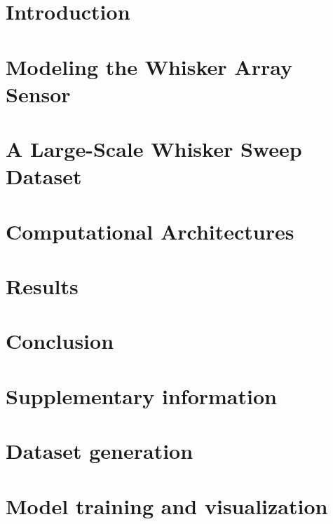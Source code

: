 \documentclass{article}
\newcommand{\beginsupplement}{%
	\setcounter{table}{0}
	\renewcommand{\thetable}{S\arabic{table}}%
	\setcounter{figure}{0}
	\renewcommand{\thefigure}{S\arabic{figure}}%
	\setcounter{section}{0}
	\renewcommand{\thesection}{\arabic{section}}%
}
\begin{document}
\section{Introduction} %
\vspace{-4mm}

\vspace{-3mm}
\section{Modeling the Whisker Array Sensor} %
\vspace{-4mm}

\vspace{-3mm}
\section{A Large-Scale Whisker Sweep Dataset} %
\vspace{-4mm}

\vspace{-3mm}
\section{Computational Architectures} %
\vspace{-4mm}

\vspace{-3mm}
\section{Results} %
\vspace{-4mm}

\vspace{-3mm}
\section{Conclusion}  %
\vspace{-4mm}


{\small
}


\newpage

\section*{Supplementary information}
\beginsupplement
\appendix

\section{Dataset generation}


\section{Model training and visualization}

\end{document}
